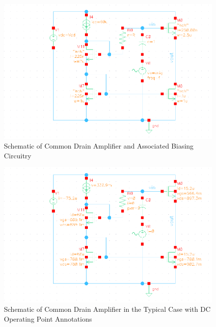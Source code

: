 \documentclass{article}
\begin{document}
\begin{figure}[H]
\centering
\includegraphics[width=6in]{2_cd_schematic.png}
\caption{Schematic of Common Drain Amplifier and Associated Biasing Circuitry}
\label{cd_schem}
\end{figure}

\begin{figure}[H]
\centering
\includegraphics[width=6in]{2_cd_dcop.png}
\caption{Schematic of Common Drain Amplifier in the Typical Case with DC Operating Point Annotations}
\label{cd_dcop}
\end{figure}
\end{document}
